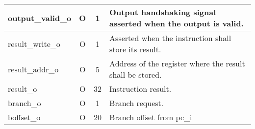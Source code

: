 {\begin{xltabular}{0.9\textwidth}{|l|c|c|X|}
  \hline
  output\_valid\_o & O & 1 & Output handshaking signal asserted when the output is valid. \\
  \hline
  result\_write\_o & O & 1 & Asserted when the instruction shall store its result. \\
  \hline
  result\_addr\_o & O & 5 & Address of the register where the result shall be stored. \\
  \hline
  result\_o & O & 32 & Instruction result. \\
  \hline
  branch\_o & O & 1 & Branch request. \\
  \hline
  boffset\_o & O & 20 & Branch offset from pc\_i \\
  \hline
\end{xltabular}
}
